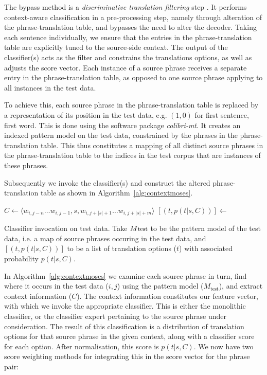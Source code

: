 \documentclass[smallextended]{svjour3}       %
\theoremstyle{break}
\begin{document}
The bypass method is a \emph{discriminative translation filtering}
step \citep{Rejwanul+11}. It performs context-aware classification in
a pre-processing step, namely through alteration of the
phrase-translation table, and bypasses the need to alter the
decoder. Taking each sentence individually, we ensure that the entries
in the phrase-translation table are explicitly tuned to the
source-side context. The output of the classifier(s) acts as the
filter and constrains the translations options, as well as adjusts the
score vector. Each instance of a source phrase receives a separate entry
in the phrase-translation table, as opposed to one source phrase
applying to all instances in the test data.

To achieve this, each source phrase in the phrase-translation table is
replaced by a representation of its position in the test data, e.g.
$(1,0)$ for first sentence, first word.  This is done using the
software package \emph{colibri-mt}. It creates an indexed pattern
model on the test data, constrained by the phrases in the
phrase-translation table. This thus constitutes a mapping of all
distinct source phrases in the phrase-translation table to the indices
in the test corpus that are instances of these phrases.

Subsequently we invoke the classifier(s) and construct the altered
phrase-translation table as shown in Algorithm~\ref{alg:contextmoses}.

\begin{algorithm}
\begin{algorithmic}
    \State $C \gets \langle w_{i,j-n} \ldots w_{i,j-1}, s, w_{i,j+|s|+1} \ldots w_{i,j+|s|+m} \rangle$
    \State $[(t, p(t|s,C) )] \gets$ 
  \EndFor
\EndFor
\end{algorithmic}
\caption{Classifier invocation on test data. Take $M{\footnotesize\text{test}}$ to be the pattern
model of the test data, i.e. a map of source phrases occuring in the test
data, and $[(t,p(t|s,C))]$ to be a list of translation options ($t$) with
associated probability $p(t|s,C)$.}
\label{alg:contextmoses}
\end{algorithm}

In Algorithm~\ref{alg:contextmoses} we examine each source phrase in turn, find
where it occurs in the test data ($i,j$) using the pattern model
($M_{\text{test}}$), and extract context information ($C$). The context
information constitutes our feature vector, with which we invoke the
appropriate classifier. This is either the monolithic classifier, or the
classifier expert pertaining to the source phrase under consideration. The
result of this classification is a distribution of translation options for that
source phrase in the given context, along with a classifier score for each
option. After normalisation, this score is $p(t|s,C)$. We now have two score
weighting methods for integrating this in the score vector for the phrase pair:
\end{document}
